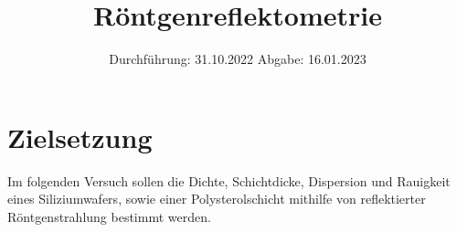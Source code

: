 

\subject{V44}
\title{Röntgenreflektometrie}
\date{
    Durchführung: 31.10.2022
     \hspace{3em}
    Abgabe: 16.01.2023
}


\maketitle
\thispagestyle{empty}
\tableofcontents
\newpage

\section{Zielsetzung}

    Im folgenden Versuch sollen die Dichte,
    Schichtdicke,
    Dispersion und Rauigkeit eines Siliziumwafers,
    sowie einer Polysterolschicht mithilfe von reflektierter Röntgenstrahlung bestimmt werden.


\clearpage


\clearpage


\clearpage


\clearpage

\printbibliography


